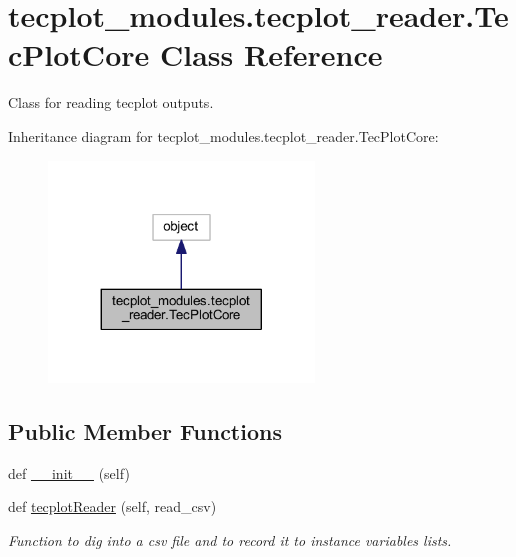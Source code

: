 \hypertarget{classtecplot__modules_1_1tecplot__reader_1_1_tec_plot_core}{}\section{tecplot\+\_\+modules.\+tecplot\+\_\+reader.\+Tec\+Plot\+Core Class Reference}
\label{classtecplot__modules_1_1tecplot__reader_1_1_tec_plot_core}


Class for reading tecplot outputs.  




Inheritance diagram for tecplot\+\_\+modules.\+tecplot\+\_\+reader.\+Tec\+Plot\+Core\+:\nopagebreak
\begin{figure}[H]
\begin{center}
\leavevmode
\includegraphics[width=200pt]{classtecplot__modules_1_1tecplot__reader_1_1_tec_plot_core__inherit__graph}
\end{center}
\end{figure}
\subsection*{Public Member Functions}
\begin{DoxyCompactItemize}
\item 
def \hyperlink{classtecplot__modules_1_1tecplot__reader_1_1_tec_plot_core_a15954180c0b4a9677efd980873a91773}{\+\_\+\+\_\+init\+\_\+\+\_\+} (self)
\item 
def \hyperlink{classtecplot__modules_1_1tecplot__reader_1_1_tec_plot_core_a9cf438934b57cd1d0bef90bcc00f27ac}{tecplot\+Reader} (self, read\+\_\+csv)
\begin{DoxyCompactList}\small\item\em Function to dig into a csv file and to record it to instance variables lists. \end{DoxyCompactList}\end{DoxyCompactItemize}
